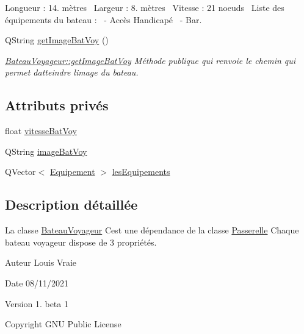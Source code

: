 \begin{DoxyCompactItemize}
\begin{DoxyCompactList}
Longueur \+: 14. mètres~\newline
Largeur \+: 8. mètres~\newline
Vitesse \+: 21 noeuds~\newline
Liste des équipements du bateau \+:~\newline
-\/ Accès Handicapé~\newline
-\/ Bar. \end{DoxyCompactList}\item 
Q\+String \hyperlink{class_bateau_voyageur_a3154786b2f572d0c2a2ac975757295eb}{get\+Image\+Bat\+Voy} ()
\begin{DoxyCompactList}\small\item\em \hyperlink{class_bateau_voyageur_a3154786b2f572d0c2a2ac975757295eb}{Bateau\+Voyageur\+::get\+Image\+Bat\+Voy} Méthode publique qui renvoie le chemin qui permet d\textquotesingle{}atteindre l\textquotesingle{}image du bateau. \end{DoxyCompactList}\end{DoxyCompactItemize}
\subsection*{Attributs privés}
\begin{DoxyCompactItemize}
\item 
float \hyperlink{class_bateau_voyageur_a245a2e10cb6264193306f728b0af04cb}{vitesse\+Bat\+Voy}
\item 
Q\+String \hyperlink{class_bateau_voyageur_aa00ee12fc973cf555a5b07cbdcf573a3}{image\+Bat\+Voy}
\item 
Q\+Vector$<$ \hyperlink{class_equipement}{Equipement} $>$ \hyperlink{class_bateau_voyageur_a570ffdd189b44025d2e8d88e5dcdb1e2}{les\+Equipements}
\end{DoxyCompactItemize}


\subsection{Description détaillée}
La classe \hyperlink{class_bateau_voyageur}{Bateau\+Voyageur} C\textquotesingle{}est une dépendance de la classe \hyperlink{class_passerelle}{Passerelle} Chaque bateau voyageur dispose de 3 propriétés. 

\begin{DoxyAuthor}{Auteur}
Louis Vraie 
\end{DoxyAuthor}
\begin{DoxyDate}{Date}
08/11/2021 
\end{DoxyDate}
\begin{DoxyVersion}{Version}
1. beta 1 
\end{DoxyVersion}
\begin{DoxyCopyright}{Copyright}
G\+NU Public License 
\end{DoxyCopyright}


